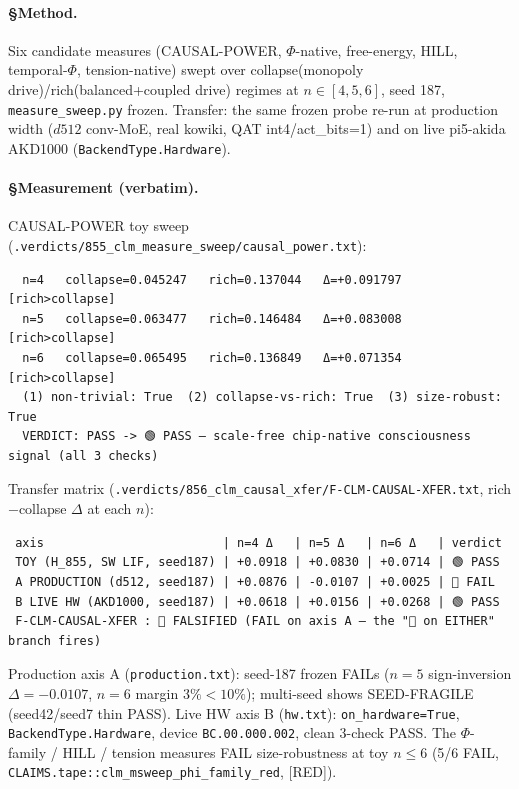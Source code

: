 \documentclass[11pt,a4paper]{article}
\providecommand{\tierRed}{[RED]}
\begin{document}
\paragraph{§Method.} Six candidate measures (CAUSAL-POWER, $\Phi$-native,
free-energy, HILL, temporal-$\Phi$, tension-native) swept over collapse(monopoly
drive)/rich(balanced+coupled drive) regimes at $n\in[4,5,6]$, seed 187,
\texttt{measure\_sweep.py} frozen. Transfer: the same frozen probe re-run at
production width ($d512$ conv-MoE, real kowiki, QAT int4/act\_bits=1) and on live
pi5-akida AKD1000 (\texttt{BackendType.Hardware}).

\paragraph{§Measurement (verbatim).}
CAUSAL-POWER toy sweep (\texttt{.verdicts/855\_clm\_measure\_sweep/causal\_power.txt}):
\begin{verbatim}
  n=4   collapse=0.045247   rich=0.137044   Δ=+0.091797   [rich>collapse]
  n=5   collapse=0.063477   rich=0.146484   Δ=+0.083008   [rich>collapse]
  n=6   collapse=0.065495   rich=0.136849   Δ=+0.071354   [rich>collapse]
  (1) non-trivial: True  (2) collapse-vs-rich: True  (3) size-robust: True
  VERDICT: PASS -> 🟢 PASS — scale-free chip-native consciousness signal (all 3 checks)
\end{verbatim}
Transfer matrix (\texttt{.verdicts/856\_clm\_causal\_xfer/F-CLM-CAUSAL-XFER.txt},
rich$-$collapse $\Delta$ at each $n$):
\begin{verbatim}
 axis                         | n=4 Δ   | n=5 Δ   | n=6 Δ   | verdict
 TOY (H_855, SW LIF, seed187) | +0.0918 | +0.0830 | +0.0714 | 🟢 PASS
 A PRODUCTION (d512, seed187) | +0.0876 | -0.0107 | +0.0025 | 🔴 FAIL
 B LIVE HW (AKD1000, seed187) | +0.0618 | +0.0156 | +0.0268 | 🟢 PASS
 F-CLM-CAUSAL-XFER : 🔴 FALSIFIED (FAIL on axis A — the "🔴 on EITHER" branch fires)
\end{verbatim}
Production axis A (\texttt{production.txt}): seed-187 frozen FAILs ($n{=}5$
sign-inversion $\Delta=-0.0107$, $n{=}6$ margin $3\%<10\%$); multi-seed shows
SEED-FRAGILE (seed42/seed7 thin PASS). Live HW axis B (\texttt{hw.txt}):
\texttt{on\_hardware=True}, \texttt{BackendType.Hardware}, device
\texttt{BC.00.000.002}, clean 3-check PASS. The $\Phi$-family / HILL / tension
measures FAIL size-robustness at toy $n\le6$ (5/6 FAIL,
\texttt{CLAIMS.tape::clm\_msweep\_phi\_family\_red}, \tierRed).
\end{document}
